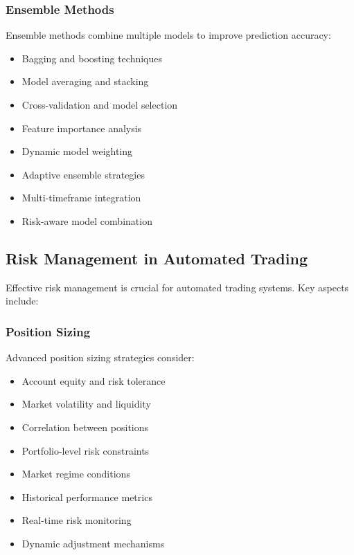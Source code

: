 \documentclass[conference]{IEEEtran}
\begin{document}
\subsubsection{Ensemble Methods}
Ensemble methods combine multiple models to improve prediction accuracy:
\begin{itemize}
    \item Bagging and boosting techniques
    \item Model averaging and stacking
    \item Cross-validation and model selection
    \item Feature importance analysis
    \item Dynamic model weighting
    \item Adaptive ensemble strategies
    \item Multi-timeframe integration
    \item Risk-aware model combination
\end{itemize}

\subsection{Risk Management in Automated Trading}
Effective risk management is crucial for automated trading systems. Key aspects include:

\subsubsection{Position Sizing}
Advanced position sizing strategies consider:
\begin{itemize}
    \item Account equity and risk tolerance
    \item Market volatility and liquidity
    \item Correlation between positions
    \item Portfolio-level risk constraints
    \item Market regime conditions
    \item Historical performance metrics
    \item Real-time risk monitoring
    \item Dynamic adjustment mechanisms
\end{itemize}
\end{document}
